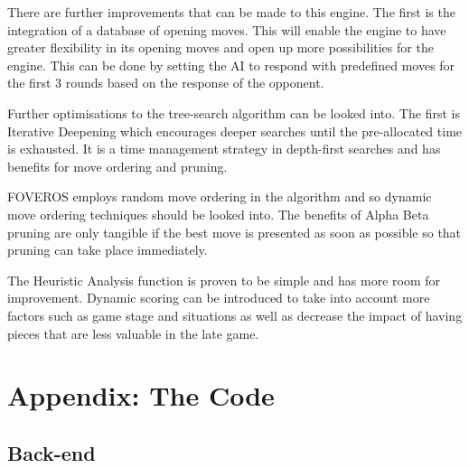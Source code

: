 \documentclass[11pt,a4paper]{article}
\begin{document}
	There are further improvements that can be made to this engine. The first is the integration of a database of opening moves. This will enable the engine to have greater flexibility in its opening moves and open up more possibilities for the engine. This can be done by setting the AI to respond with predefined moves for the first 3 rounds based on the response of the opponent.

	Further optimisations to the tree-search algorithm can be looked into. The first is Iterative Deepening which encourages deeper searches until the pre-allocated time is exhausted. It is a time management strategy in depth-first searches and has benefits for move ordering and pruning.\cite{chess9}

	FOVEROS employs random move ordering in the algorithm and so dynamic move ordering techniques should be looked into. The benefits of Alpha Beta pruning are only tangible if the best move is presented as soon as possible so that pruning can take place immediately.\cite{chess8}
 
	The Heuristic Analysis function is proven to be simple and has more room for improvement. Dynamic scoring can be introduced to take into account more factors such as game stage and situations as well as decrease the impact of having pieces that are less valuable in the late game.

\newpage


\newpage

\appendix
\section{Appendix: The Code}
\subsection{Back-end}
\end{document}
